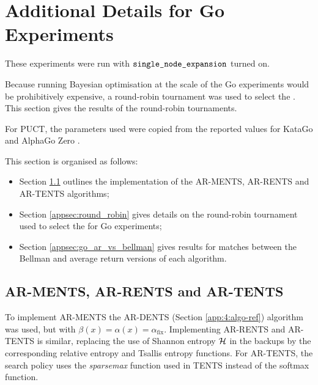 































\clearpage
\section{Additional Details for Go Experiments} 
\label{appsec:4:go}

    These experiments were run with ${\textnormal{\texttt{single\_node\_expansion}}}$ turned on.

    Because running Bayesian optimisation at the scale of the Go experiments would be prohibitively expensive, a round-robin tournament was used to select the . This section gives the results of the round-robin tournaments.

    For PUCT, the parameters used were copied from the reported values for KataGo and AlphaGo Zero \cite{katago,alpha_go_zero}.

    This section is organised as follows:
    \begin{itemize}
        \item Section \ref{appsec:go_ar_ments} outlines the implementation of the AR-MENTS, AR-RENTS and AR-TENTS algorithms;
        \item Section \ref{appsec:round_robin} gives details on the round-robin tournament used to select the  for Go experiments;
        \item Section \ref{appsec:go_ar_vs_bellman} gives results for matches between the Bellman and average return versions of each algorithm.
    \end{itemize}






\subsection{AR-MENTS, AR-RENTS and AR-TENTS}
\label{appsec:go_ar_ments}

    To implement AR-MENTS the AR-DENTS (Section \ref{app:4:algo-ref}) algorithm was used, but with $\beta(x)=\alpha(x)=\alpha_{\text{fix}}$. Implementing AR-RENTS and AR-TENTS is similar, replacing the use of Shannon entropy $\mathcal{H}$ in the backups by the corresponding relative entropy and Tsallis entropy functions. For AR-TENTS, the search policy uses the \textit{sparsemax} function used in TENTS instead of the softmax function. 





